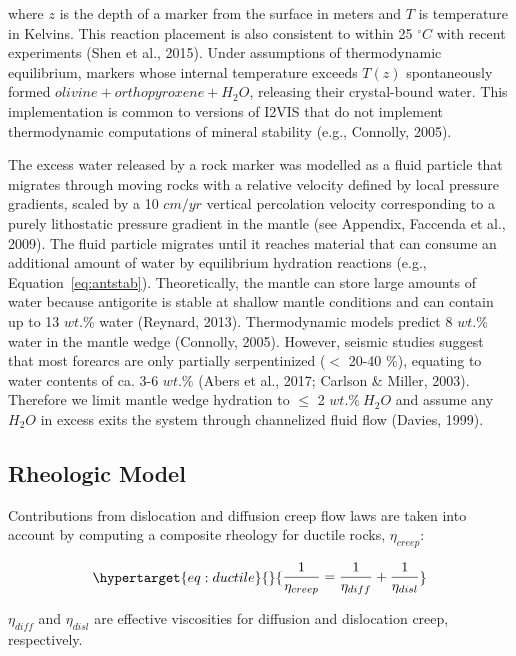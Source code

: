 \documentclass[draft,linenumbers]{agujournal2018}
\begin{document}
where \(z\) is the depth of a marker from the surface in meters and
\(T\) is temperature in Kelvins. This reaction placement is also
consistent to within 25 \(^{\circ}C\) with recent experiments (Shen et
al., 2015). Under assumptions of thermodynamic equilibrium, markers
whose internal temperature exceeds \(T(z)\) spontaneously formed
\(olivine + orthopyroxene + H_{2}O\), releasing their crystal-bound
water. This implementation is common to versions of I2VIS that do not
implement thermodynamic computations of mineral stability (e.g.,
Connolly, 2005).

The excess water released by a rock marker was modelled as a fluid
particle that migrates through moving rocks with a relative velocity
defined by local pressure gradients, scaled by a 10 \(cm/yr\) vertical
percolation velocity corresponding to a purely lithostatic pressure
gradient in the mantle (see Appendix, Faccenda et al., 2009). The fluid
particle migrates until it reaches material that can consume an
additional amount of water by equilibrium hydration reactions (e.g.,
Equation~\ref{eq:antstab}). Theoretically, the mantle can store large
amounts of water because antigorite is stable at shallow mantle
conditions and can contain up to 13 \(wt.\%\) water (Reynard, 2013).
Thermodynamic models predict 8 \(wt.\%\) water in the mantle wedge
(Connolly, 2005). However, seismic studies suggest that most forearcs
are only partially serpentinized (\(<\) 20-40 \(\%\)), equating to water
contents of ca. 3-6 \(wt.\%\) (Abers et al., 2017; Carlson \& Miller,
2003). Therefore we limit mantle wedge hydration to \(\leq\) 2
\(wt.\%\ H_{2}O\) and assume any \(H_{2}O\) in excess exits the system
through channelized fluid flow (Davies, 1999).

\subsection{Rheologic Model}

Contributions from dislocation and diffusion creep flow laws are taken
into account by computing a composite rheology for ductile rocks,
\(\eta_{creep}\):

\begin{equation}\protect\hypertarget{eq:ductile}{}{\begin{aligned}\frac{1}{\eta_{creep}} = \frac{1}{\eta_{diff}} + \frac{1}{\eta_{disl}}\end{aligned}}\label{eq:ductile}\end{equation}

\(\eta_{diff}\) and \(\eta_{disl}\) are effective viscosities for
diffusion and dislocation creep, respectively.
\end{document}
